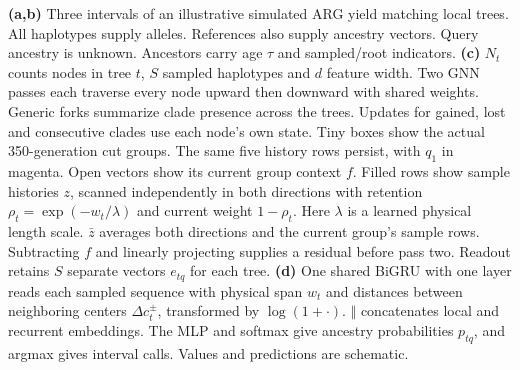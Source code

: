 \caption{\textbf{(a,b)} Three intervals of an illustrative simulated ARG yield matching local trees. All haplotypes supply alleles. References also supply ancestry vectors. Query ancestry is unknown. Ancestors carry age $\tau$ and sampled/root indicators. \textbf{(c)} $N_t$ counts nodes in tree $t$, $S$ sampled haplotypes and $d$ feature width. Two GNN passes each traverse every node upward then downward with shared weights. Generic forks summarize clade presence across the trees. Updates for gained, lost and consecutive clades use each node's own state. Tiny boxes show the actual 350-generation cut groups. The same five history rows persist, with $q_1$ in magenta. Open vectors show its current group context $f$. Filled rows show sample histories $z$, scanned independently in both directions with retention $\rho_t=\exp(-w_t/\lambda)$ and current weight $1-\rho_t$. Here $\lambda$ is a learned physical length scale. $\bar z$ averages both directions and the current group's sample rows. Subtracting $f$ and linearly projecting supplies a residual before pass two. Readout retains $S$ separate vectors $e_{tq}$ for each tree. \textbf{(d)} One shared BiGRU with one layer reads each sampled sequence with physical span $w_t$ and distances between neighboring centers $\Delta c_t^\pm$, transformed by $\log(1+\cdot)$. $\Vert$ concatenates local and recurrent embeddings. The MLP and softmax give ancestry probabilities $p_{tq}$, and argmax gives interval calls. Values and predictions are schematic.}
